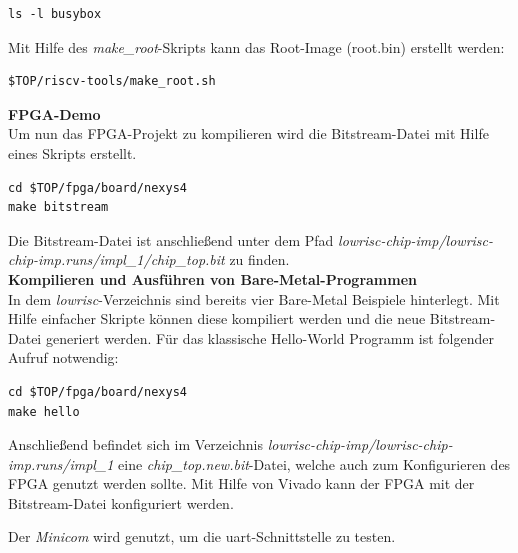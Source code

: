 \begin{lstlisting}[caption={BusyBox},label={code:busybox}]
ls -l busybox
\end{lstlisting}

Mit Hilfe des \emph{make\_root}-Skripts kann das Root-Image (root.bin) erstellt werden:\\


\begin{lstlisting}[caption={Generieren des Root-Image},label={code:rootimage}]
$TOP/riscv-tools/make_root.sh
\end{lstlisting}

\textbf{FPGA-Demo}\\

Um nun das FPGA-Projekt zu kompilieren wird die Bitstream-Datei mit Hilfe eines Skripts erstellt.\\

\begin{lstlisting}[caption={Erzeugen des Bitfiles},label={code:bitfile}]
cd $TOP/fpga/board/nexys4
make bitstream
\end{lstlisting}


Die Bitstream-Datei ist anschließend unter dem Pfad \emph{lowrisc-chip-imp/lowrisc-chip-imp.runs/impl\_1/chip\_top.bit} zu finden.\\

\textbf{Kompilieren und Ausführen von Bare-Metal-Programmen}\\

In dem \emph{lowrisc}-Verzeichnis sind bereits vier Bare-Metal Beispiele hinterlegt. Mit Hilfe einfacher Skripte können diese kompiliert werden und die neue Bitstream-Datei generiert werden.
Für das klassische Hello-World Programm ist folgender Aufruf notwendig:\\

\begin{lstlisting}[caption={Erzeugen und kompilieren eines Beispielprogrammes},label={code:helloworld}]
cd $TOP/fpga/board/nexys4
make hello
\end{lstlisting}


Anschließend befindet sich im Verzeichnis \emph{lowrisc-chip-imp/lowrisc-chip-imp.runs/impl\_1} eine \emph{chip\_top.new.bit}-Datei, welche auch zum Konfigurieren des FPGA genutzt werden sollte.
Mit Hilfe von Vivado kann der FPGA mit der Bitstream-Datei konfiguriert werden.

Der \emph{Minicom} wird genutzt, um die \ac{uart}-Schnittstelle zu testen.\\

